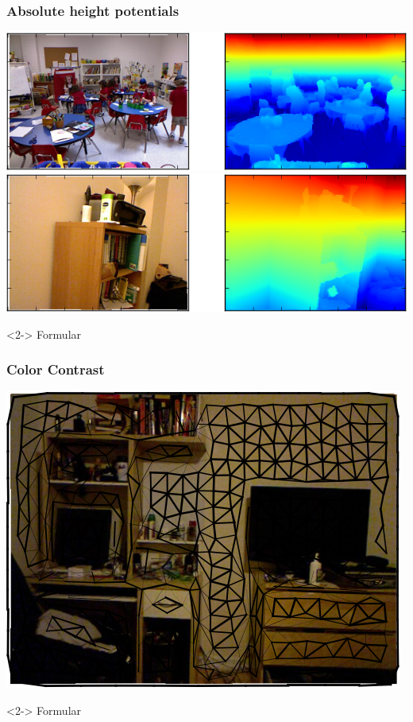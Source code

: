 \documentclass[final,ignorenonframetext,compress]{beamer}
\begin{document}
    \begin{frame}
        \frametitle{Absolute height potentials}
        \begin{center}
            \includegraphics[width=.6\linewidth]{images/height_success}\\
            \vspace{3mm}
            \includegraphics[width=.6\linewidth]{images/height_failure}
        \end{center}
        \begin{visibleenv}<2->
            Formular %
        \end{visibleenv}

    \end{frame}


    \begin{frame}
        \frametitle{Color Contrast}
        \begin{center}
            \includegraphics[width=.8\linewidth]{images/00062_pipline_feature_pairwise_1}
        \end{center}
        \begin{visibleenv}<2->
            Formular %
        \end{visibleenv}

    \end{frame}
\end{document}
